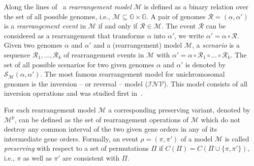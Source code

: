\documentclass{svmult}
\newcommand{\m}[1]{\mathcal{#1}}
\begin{document}
Along the lines of~\cite{Bergeron_2010} a \emph{rearrangement model}
$\mathcal{M}$ is defined as a binary relation over the set of all possible
genomes, i.e., $\mathcal{M} \subseteq \mathbb{G} \times \mathbb{G}$.
%
A pair of genomes $\mathcal{R}=(\alpha,\alpha')$ is a \emph{rearrangement event}
in $\mathcal{M}$ if and only if $\mathcal{R} \in \mathcal{M}$. The event $\mathcal{R}$ can be considered as a rearrangement that
transforms $\alpha$ into $\alpha'$, we write $\alpha'=\alpha \circ \mathcal{R}$.
%
Given two genomes $\alpha$ and $\alpha'$ and a (rearrangement) model
$\mathcal{M}$, a \emph{scenario} is a sequence $\mathcal{R}_1,\ldots,
\mathcal{R}_k$ of rearrangement events in $\mathcal{M}$ with
$\alpha'=\alpha \circ \mathcal{R}_1\circ\ldots\circ\mathcal{R}_k$.
The set of all possible scenarios for two given
genomes $\alpha$ and $\alpha'$ is denoted by $\mathcal{S}_\mathcal{M}(\alpha,\alpha')$.
The most famous rearrangement model for unichromosomal genomes is the inversion 
-- or reversal -- model ($\mathcal{INV}$). This model consists of all inversion operations 
and was studied first in~\cite{Sankoff_1992,Watterson_1982}. 


For each rearrangement model $\mathcal{M}$ a corresponding preserving
variant, denoted by $\m{M}^p$, can be defined as the set of
rearrangement operations of $\m{M}$ which do not destroy any common interval of
the two given gene orders in any of its intermediate gene orders. 
Formally, an event $\rho=(\pi,\pi')$ of a model $\m{M}$ is called \emph{preserving} with 
respect to a set of permutations $\Pi$ if $C(\Pi)=C(\Pi \cup \{\pi,\pi'\})$, i.e., $\pi$ as well as $\pi'$ are consistent with $\Pi$. 
\end{document}
